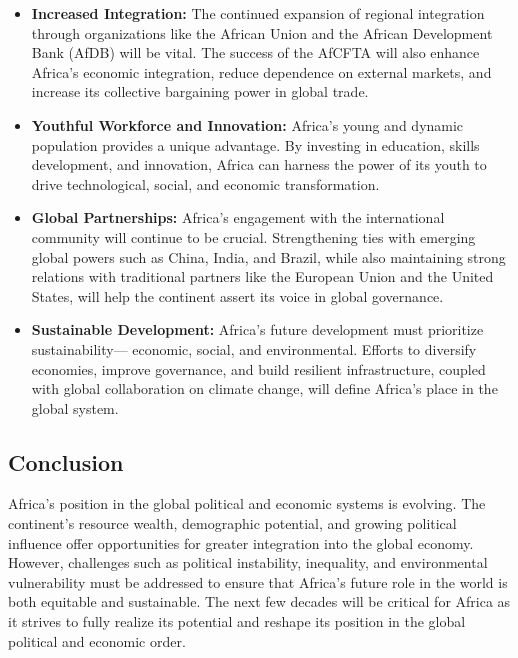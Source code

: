 \documentclass[10pt]{article}
\begin{document}
\begin{itemize}
  \item \textbf{Increased Integration:} The continued expansion of regional integration through
    organizations like the African Union and the African Development Bank (AfDB) will be
    vital. The success of the AfCFTA will also enhance Africa's economic integration, reduce
    dependence on external markets, and increase its collective bargaining power in global
    trade.

  \item \textbf{Youthful Workforce and Innovation:} Africa's young and dynamic population provides a
    unique advantage. By investing in education, skills development, and innovation, Africa
    can harness the power of its youth to drive technological, social, and economic
    transformation.

  \item \textbf{Global Partnerships:} Africa's engagement with the international community will
    continue to be crucial. Strengthening ties with emerging global powers such as China,
    India, and Brazil, while also maintaining strong relations with traditional partners like
    the European Union and the United States, will help the continent assert its voice in
    global governance.

  \item \textbf{Sustainable Development:} Africa's future development must prioritize sustainability---
    economic, social, and environmental. Efforts to diversify economies, improve
    governance, and build resilient infrastructure, coupled with global collaboration on
    climate change, will define Africa's place in the global system.
\end{itemize}

\subsection*{Conclusion}
Africa's position in the global political and economic systems is evolving. The continent's
resource wealth, demographic potential, and growing political influence offer opportunities for
greater integration into the global economy. However, challenges such as political instability,
inequality, and environmental vulnerability must be addressed to ensure that Africa's future role
in the world is both equitable and sustainable. The next few decades will be critical for Africa as
it strives to fully realize its potential and reshape its position in the global political and economic
order.
\end{document}
